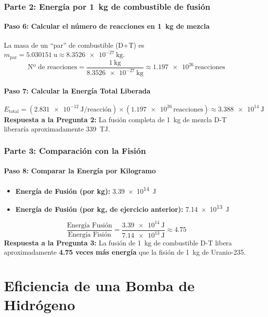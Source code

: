 \documentclass[11pt,a4paper]{article}
\begin{document}
\begin{enumerate}
\subsubsection*{Parte 2: Energía por \SI{1}{\kilo\gram} de combustible de fusión}

\paragraph{Paso 6: Calcular el número de reacciones en \SI{1}{\kilo\gram} de mezcla}
La masa de un ``par'' de combustible (D+T) es $m_{\text{par}} = \SI{5.030151}{\atomicmassunit} \approx \SI{8.3526e-27}{\kilo\gram}$.
\[ \text{Nº de reacciones} = \frac{\SI{1}{\kilo\gram}}{\SI{8.3526e-27}{\kilo\gram}} \approx \num{1.197e26} \, \text{reacciones} \]

\paragraph{Paso 7: Calcular la Energía Total Liberada}
\[ E_{\text{total}} = (\SI{2.831e-12}{\joule\per\text{reacción}}) \times (\num{1.197e26} \, \text{reacciones}) \approx \SI{3.388e14}{\joule} \]
\textbf{Respuesta a la Pregunta 2:} La fusión completa de \SI{1}{\kilo\gram} de mezcla D-T liberaría aproximadamente \SI{339}{\tera\joule}.

\subsubsection*{Parte 3: Comparación con la Fisión}

\paragraph{Paso 8: Comparar la Energía por Kilogramo}
\begin{itemize}
    \item \textbf{Energía de Fusión (por kg):} \SI{3.39e14}{\joule}
    \item \textbf{Energía de Fusión (por kg, de ejercicio anterior):} \SI{7.14e13}{\joule}
\end{itemize}
\[ \frac{\text{Energía Fusión}}{\text{Energía Fisión}} = \frac{\SI{3.39e14}{\joule}}{\SI{7.14e13}{\joule}} \approx 4.75 \]
\textbf{Respuesta a la Pregunta 3:} La fusión de \SI{1}{\kilo\gram} de combustible D-T libera aproximadamente \textbf{4.75 veces más energía} que la fisión de \SI{1}{\kilo\gram} de Uranio-235.

\section{Eficiencia de una Bomba de Hidrógeno}


\end{enumerate}
\end{document}

